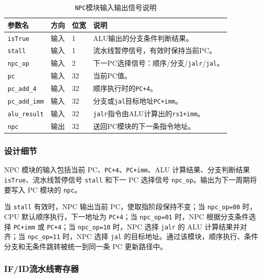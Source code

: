 \documentclass[12pt,a4paper]{ctexart}
\newcommand{\code}[1]{\texttt{#1}}
\begin{document}
\begin{table}[H]
	\centering
	\caption{\code{NPC}模块输入输出信号说明}
	\footnotesize
	\renewcommand{\arraystretch}{1.15}
	\begin{tabularx}{\textwidth}{p{3.2cm}p{1.5cm}p{2.1cm}X}
		\toprule
		参数名                 & 方向 & 位宽 & 说明                                     \\
		\midrule
		\code{isTrue}       & 输入 & 1  & ALU输出的分支条件判断结果。                        \\
		\code{stall}        & 输入 & 1  & 流水线暂停信号，有效时保持当前PC。                     \\
		\code{npc\_op}      & 输入 & 2  & 下一PC选择信号：顺序/分支/\code{jalr}/\code{jal}。 \\
		\code{pc}           & 输入 & 32 & 当前PC值。                                 \\
		\code{pc\_add\_4}   & 输入 & 32 & 顺序执行时的\code{PC+4}。                     \\
		\code{pc\_add\_imm} & 输入 & 32 & 分支或\code{jal}目标地址\code{PC+imm}。        \\
		\code{alu\_result}  & 输入 & 32 & \code{jalr}指令由ALU计算出的\code{rs1+imm}。   \\
		\code{npc}          & 输出 & 32 & 送回PC模块的下一条指令地址。                        \\
		\bottomrule
	\end{tabularx}
\end{table}

\subsubsection*{设计细节}

NPC 模块的输入包括当前 PC、\code{PC+4}、\code{PC+imm}、ALU 计算结果、分支判断结果 \code{isTrue}、流水线暂停信号 \code{stall} 和下一 PC 选择信号 \code{npc\_op}。输出为下一周期将要写入 PC 模块的 \code{npc}。

当 \code{stall} 有效时，NPC 输出当前 PC，使取指阶段保持不变；当 \code{npc\_op=00} 时，CPU 默认顺序执行，下一地址为 \code{PC+4}；当 \code{npc\_op=01} 时，NPC 根据分支条件选择 \code{PC+imm} 或 \code{PC+4}；当 \code{npc\_op=10} 时，NPC 选择 \code{jalr} 的 ALU 计算结果并对齐；当 \code{npc\_op=11} 时，NPC 选择 \code{jal} 的目标地址。通过该模块，顺序执行、条件分支和无条件跳转被统一到同一条 PC 更新路径中。

\subsubsection{IF/ID流水线寄存器}
\end{document}

